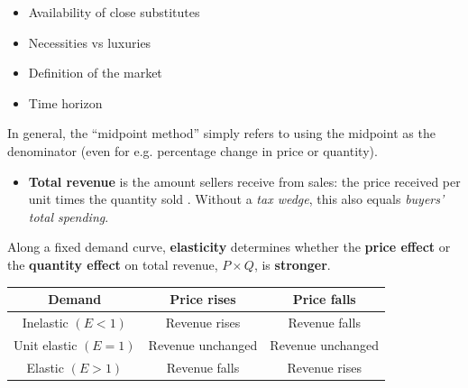 \documentclass[12pt,a4paper]{article}
\begin{document}
\begin{itemize}
    \item Availability of close substitutes
    \item Necessities vs luxuries
    \item Definition of the market
    \item Time horizon
\end{itemize}



\noindent In general, the ``midpoint method'' simply refers to using the midpoint as the denominator (even for e.g. percentage change in price or quantity). \\

\begin{itemize}
    \item \textbf{Total revenue} is the amount sellers receive from sales: the price received per unit times the quantity sold . Without a \emph{tax wedge}, this also equals \emph{buyers' total spending}.
\end{itemize}

\noindent Along a fixed demand curve, \textbf{elasticity} determines whether the \textbf{price effect} or the \textbf{quantity effect} on total revenue, $P \times Q$, is \textbf{stronger}. \\

\vspace{-1.0em}\begin{table}[H]
    \centering
    \begin{tabular}{ | c c c | } 
    \hline
    \textbf{Demand} & \textbf{Price rises} & \textbf{Price falls} \\
    \hline
    Inelastic $(E < 1)$ & Revenue rises & Revenue falls \\
    Unit elastic $(E = 1)$ & Revenue unchanged & Revenue unchanged \\
    Elastic $(E > 1)$ & Revenue falls & Revenue rises \\
    \hline
    \end{tabular}
\end{table}
\end{document}
